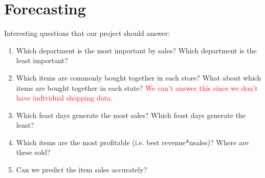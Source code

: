 \documentclass[12pt]{article}
\begin{document}
\clearpage
\section{Forecasting}

Interesting questions that our project should answer:
\begin{enumerate}
    \item Which department is the most important by sales? Which department is the least important?
    \item Which items are commonly bought together in each store? What about which items are bought together in each state? \textcolor{red}{We can't answer this since we don't have individual shopping data.}
    \item Which feast days generate the most sales? Which feast days generate the least?
    \item Which items are the most profitable (i.e. best revenue*nsales)? Where are these sold?
    \item Can we predict the item sales accurately?
\end{enumerate}
\end{document}

